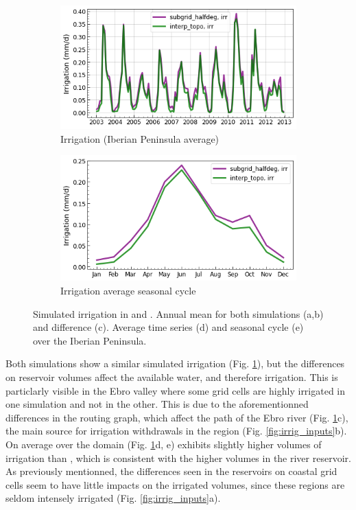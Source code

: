 \begin{figure}[htbp]
    \begin{subfigure}[b]{0.48\textwidth}
        \caption{Irrigation (Iberian Peninsula average)}
        \includegraphics[width=\textwidth]{images/chap3/time_series/irrigation_time_series.png}
    \end{subfigure}    
    \begin{subfigure}[b]{0.48\textwidth}
        \caption{Irrigation average seasonal cycle}
        \includegraphics[width=\textwidth]{images/chap3/time_series/irrigation_seasonal_cycle.png}
    \end{subfigure}

    \caption{Simulated irrigation in \std and \native. Annual mean for both simulations (a,b) and difference (c). Average time series (d) and seasonal cycle (e) over the Iberian Peninsula.}
    \label{fig:irrigation_halfdeg_eval}
\end{figure}

Both simulations show a similar simulated irrigation (Fig. \ref{fig:irrigation_halfdeg_eval}), but the differences on reservoir volumes affect the available water, and therefore irrigation. This is particlarly visible in the Ebro valley where some grid cells are highly irrigated in one simulation and not in the other. This is due to the aforementionned differences in the routing graph, which affect the path of the Ebro river (Fig. \ref{fig:irrigation_halfdeg_eval}c), the main source for irrigation withdrawals in the region (Fig. \ref{fig:irrig_inputs}b).
On average over the domain (Fig. \ref{fig:irrigation_halfdeg_eval}d, e) \std exhibits slightly higher volumes of irrigation than \native, which is consistent with the higher volumes in the river reservoir. As previously mentionned, the differences seen in the reservoirs on coastal grid cells seem to have little impacts on the irrigated volumes, since these regions are seldom intensely irrigated (Fig. \ref{fig:irrig_inputs}a). 

